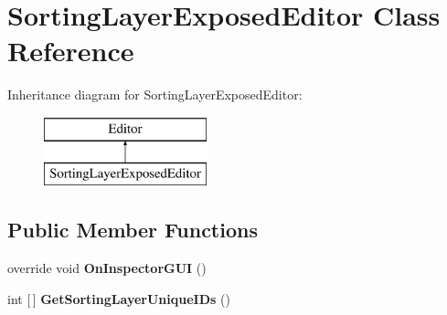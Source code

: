 \hypertarget{class_sorting_layer_exposed_editor}{}\section{Sorting\+Layer\+Exposed\+Editor Class Reference}
\label{class_sorting_layer_exposed_editor}
Inheritance diagram for Sorting\+Layer\+Exposed\+Editor\+:\begin{figure}[H]
\begin{center}
\leavevmode
\includegraphics[height=2.000000cm]{class_sorting_layer_exposed_editor}
\end{center}
\end{figure}
\subsection*{Public Member Functions}
\begin{DoxyCompactItemize}
\item 
\mbox{\label{class_sorting_layer_exposed_editor_a7ed0ea366de29a069582f71119303147}} 
override void {\bfseries On\+Inspector\+G\+UI} ()
\item 
\mbox{\label{class_sorting_layer_exposed_editor_a34701bc7d634c91d10a5951c80634903}} 
int \mbox{[}$\,$\mbox{]} {\bfseries Get\+Sorting\+Layer\+Unique\+I\+Ds} ()
\end{DoxyCompactItemize}
